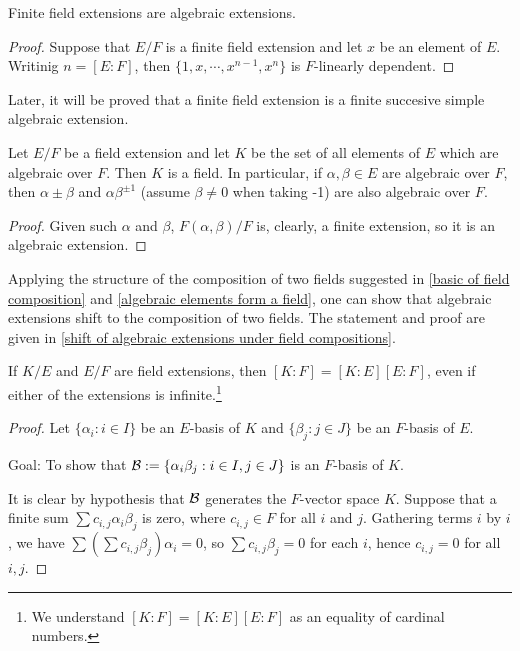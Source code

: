 \begin{prop}
    Finite field extensions are algebraic extensions.
\end{prop}
\begin{proof}
    Suppose that $E/F$ is a finite field extension and let $x$ be an element of $E$.
    Writinig $n=[E: F]$, then $\{1, x, \cdots, x^{n-1}, x^n\}$ is $F$-linearly dependent.
\end{proof}
\begin{rmk}
    Later, it will be proved that a finite field extension is a finite succesive simple algebraic extension.
\end{rmk}
\begin{cor}\label{algebraic elements form a field}
    Let $E/F$ be a field extension and let $K$ be the set of all elements of $E$ which are algebraic over $F$.
    Then $K$ is a field.
    In particular, if $\alpha, \beta\in E$ are algebraic over $F$, then $\alpha\pm\beta$ and $\alpha\beta^{\pm 1}$ (assume $\beta\neq 0$ when taking -1) are also algebraic over $F$.
\end{cor}
\begin{proof}
    Given such $\alpha$ and $\beta$, $F(\alpha, \beta)/F$ is, clearly, a finite extension, so it is an algebraic extension.
\end{proof}
Applying the structure of the composition of two fields suggested in \cref{basic of field composition} and \cref{algebraic elements form a field}, one can show that algebraic extensions shift to the composition of two fields.
The statement and proof are given in \cref{shift of algebraic extensions under field compositions}.
\begin{prop}
    If $K/E$ and $E/F$ are field extensions, then $[K: F]=[K: E][E: F]$, even if either of the extensions is infinite.\footnote{We understand $[K: F]=[K: E][E: F]$ as an equality of cardinal numbers.}
\end{prop}
\begin{proof}
    Let $\{\alpha_i: i\in I\}$ be an $E$-basis of $K$ and $\{\beta_j: j\in J\}$ be an $F$-basis of $E$.
    \begin{center}
        Goal: To show that ${\mathcal{B}}:=\{\alpha_i\beta_j: i\in I, j\in J\}$ is an $F$-basis of $K$.
    \end{center}
    It is clear by hypothesis that ${\mathcal{B}}$ generates the $F$-vector space $K$.
    Suppose that a finite sum $\sum c_{i, j}\alpha_i\beta_j$ is zero, where $c_{i, j}\in F$ for all $i$ and $j$.
    Gathering terms $i$ by $i$, we have $\sum(\sum c_{i, j}\beta_j)\alpha_i=0$, so $\sum c_{i, j}\beta_j=0$ for each $i$, hence $c_{i, j}=0$ for all $i, j$.
\end{proof}
